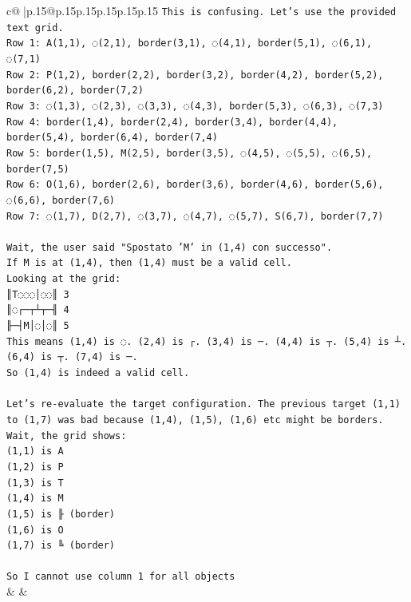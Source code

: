 \documentclass{article}
\begin{document}
{\begin{supertabular}{c@{$\;$}|p{.15\linewidth}@{}p{.15\linewidth}p{.15\linewidth}p{.15\linewidth}p{.15\linewidth}p{.15\linewidth}}
{{{\texttt{This is confusing. Let's use the provided text grid.} \\
\texttt{Row 1: A(1,1), ◌(2,1), border(3,1), ◌(4,1), border(5,1), ◌(6,1), ◌(7,1)} \\
\texttt{Row 2: P(1,2), border(2,2), border(3,2), border(4,2), border(5,2), border(6,2), border(7,2)} \\
\texttt{Row 3: ◌(1,3), ◌(2,3), ◌(3,3), ◌(4,3), border(5,3), ◌(6,3), ◌(7,3)} \\
\texttt{Row 4: border(1,4), border(2,4), border(3,4), border(4,4), border(5,4), border(6,4), border(7,4)} \\
\texttt{Row 5: border(1,5), M(2,5), border(3,5), ◌(4,5), ◌(5,5), ◌(6,5), border(7,5)} \\
\texttt{Row 6: O(1,6), border(2,6), border(3,6), border(4,6), border(5,6), ◌(6,6), border(7,6)} \\
\texttt{Row 7: ◌(1,7), D(2,7), ◌(3,7), ◌(4,7), ◌(5,7), S(6,7), border(7,7)} \\
\\ 
\texttt{Wait, the user said "Spostato 'M' in (1,4) con successo".} \\
\texttt{If M is at (1,4), then (1,4) must be a valid cell.} \\
\texttt{Looking at the grid:} \\
\texttt{║T◌◌◌│◌◌║ 3} \\
\texttt{║◌┌─┬┴┬─╢ 4} \\
\texttt{╟─┤M│◌│◌║ 5} \\
\texttt{This means (1,4) is ◌. (2,4) is ┌. (3,4) is ─. (4,4) is ┬. (5,4) is ┴. (6,4) is ┬. (7,4) is ─.} \\
\texttt{So (1,4) is indeed a valid cell.} \\
\\ 
\texttt{Let's re{-}evaluate the target configuration. The previous target (1,1) to (1,7) was bad because (1,4), (1,5), (1,6) etc might be borders.} \\
\texttt{Wait, the grid shows:} \\
\texttt{(1,1) is A} \\
\texttt{(1,2) is P} \\
\texttt{(1,3) is T} \\
\texttt{(1,4) is M} \\
\texttt{(1,5) is ╟ (border)} \\
\texttt{(1,6) is O} \\
\texttt{(1,7) is ╚ (border)} \\
\\ 
\texttt{So I cannot use column 1 for all objects} \\
            }
        }
    }
    & & \\ \\


\end{supertabular}}
\end{document}
